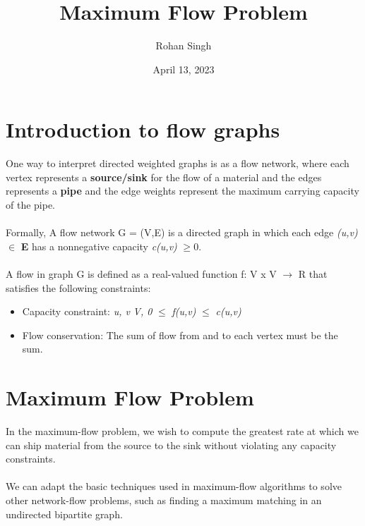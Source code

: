 \documentclass[12pt, letterpaper]{article}
\title{Maximum Flow Problem}
\author{Rohan Singh}
\date{April 13, 2023}
\begin{document}
\maketitle

\section{Introduction to flow graphs}
One way to interpret directed weighted graphs is as a flow network, where each vertex represents a \textbf{source/sink}  for the flow of a material and the edges represents a \textbf{pipe} and the edge weights represent the maximum carrying capacity of the pipe.\\\\
Formally, A flow network G = (V,E) is a directed graph in which each edge \textit{(u,v)} $\in$ \textbf{E} has a nonnegative capacity \textit{c(u,v)} $\geq{0}$.\\\\
A flow in graph G is defined as a real-valued function f: V x V $\rightarrow$ R that satisfies the following constraints:\\

\begin{itemize}
	\item Capacity constraint: \forall \textit{u, v} \in \textit{V, 0 } $\leq$ \textit{f(u,v)} $\leq$ \textit{c(u,v)}
	\item Flow conservation: The sum of flow from and to each vertex must be the sum.
\end{itemize}

\section{Maximum Flow Problem}
In the maximum-flow problem, we wish to compute the greatest rate at which we can ship material from the source to the sink without violating any capacity constraints.\\\\
We can adapt the basic techniques used in maximum-flow algorithms to solve other network-flow problems, such as finding a maximum matching in an undirected bipartite graph.\\\\
\end{document}
